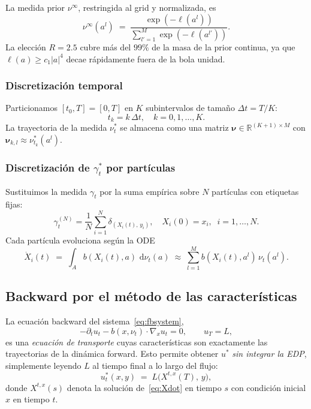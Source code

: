 \documentclass[11pt, a4paper]{article}
\theoremstyle{definition}
\newcommand{\R}{\mathbb{R}}
\newcommand{\abs}[1]{\left|#1\right|}
\newcommand{\dee}{\,\mathrm{d}}
\begin{document}
\medskip

La medida prior $\nu^{\infty}$, restringida al grid y normalizada, es
\begin{equation}
  \nu^{\infty}(a^l)
  \;=\;
  \frac{\exp(-\ell(a^l))}{\sum_{l'=1}^{M} \exp(-\ell(a^{l'}))}.
  \label{eq:nuinfgrid}
\end{equation}
La elección $R = 2.5$ cubre más del $99\%$ de la masa de la prior continua,
ya que $\ell(a) \geq c_1 \abs{a}^4$ decae rápidamente fuera de la bola
unidad.

\subsubsection{Discretización temporal}

Particionamos $[t_0, T] = [0, T]$ en $K$ subintervalos de tamaño
$\Delta t = T/K$:
\begin{equation}
  t_k = k \, \Delta t, \quad k = 0, 1, \dots, K.
\end{equation}
La trayectoria de la medida $\nu_t^*$ se almacena como una matriz
$\boldsymbol{\nu} \in \R^{(K+1) \times M}$ con
$\boldsymbol{\nu}_{k, l} \approx \nu_{t_k}^*(a^l)$.

\subsubsection{Discretización de $\gamma_t^*$ por partículas}

Sustituimos la medida $\gamma_t$ por la suma empírica sobre $N$
partículas con etiquetas fijas:
\begin{equation}
  \gamma_t^{(N)} = \frac{1}{N} \sum_{i=1}^{N}
    \delta_{(X_i(t),\, y_i)},
  \quad
  X_i(0) = x_i,
  \;\;
  i = 1, \dots, N.
  \label{eq:gammaN}
\end{equation}
Cada partícula evoluciona según la ODE
\begin{equation}
  \dot{X}_i(t)
  \;=\;
  \int_A b(X_i(t), a) \, \dee\nu_t(a)
  \;\approx\;
  \sum_{l=1}^{M} b(X_i(t), a^l) \, \nu_{t}(a^l).
  \label{eq:Xdot}
\end{equation}

\subsection{Backward por el método de las características}
\label{ssec:caracteristicas}

La ecuación backward del sistema~\eqref{eq:fbsystem},
\begin{equation}
  -\partial_t u_t - b(x, \nu_t) \cdot \nabla_x u_t = 0,
  \qquad u_T = L,
\end{equation}
es una \emph{ecuación de transporte} cuyas características son
exactamente las trayectorias de la dinámica forward. Esto permite
obtener $u^*$ \emph{sin integrar la EDP}, simplemente leyendo $L$ al
tiempo final a lo largo del flujo:
\begin{equation}
  u_t^*(x, y)
  \;=\;
  L\bigl( X^{t, x}(T),\, y \bigr),
  \label{eq:ucharac}
\end{equation}
donde $X^{t, x}(s)$ denota la solución de~\eqref{eq:Xdot} en tiempo $s$
con condición inicial $x$ en tiempo $t$.
\end{document}
